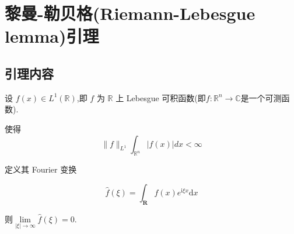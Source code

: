 \documentclass{lzureport}
\begin{document}
\newpage
\section{黎曼-勒贝格(Riemann-Lebesgue lemma)引理}
\subsection{引理内容}
设 $f(x)\in L^1(\mathbb{R})$,即 $f$ 为 $\mathbb{R}$ 上 Lebesgue 可积函数(即$f:\mathbb{R}^n\to \mathbb{C}$是一个可测函数).

使得 
$$
\|f\|_{L^1}\int_{\mathbb{R}^n}|f(x)|dx < \infty
$$

定义其 Fourier 变换

$$
\hat{f}(\xi)=\int_{\mathbf{R}}f(x)e^{\mathrm{i}\xi x}\mathrm{d}x
$$

则$\lim\limits_{|\xi|\to\infty}\hat{f}(\xi)=0.$
\end{document}
